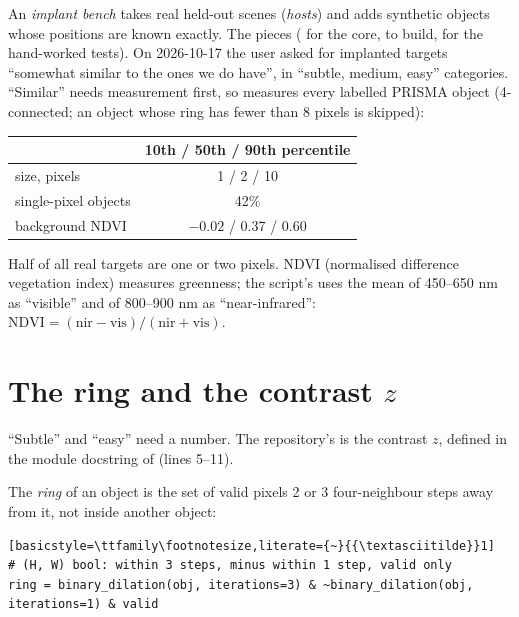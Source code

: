 An \emph{implant bench} takes real held-out scenes (\emph{hosts}) and adds synthetic objects
whose positions are known exactly. The pieces ( for the core,
 to build,  for the hand-worked
tests). On 2026-10-17 the user asked for implanted targets ``somewhat similar to the ones we do have'', in ``subtle,
medium, easy'' categories. ``Similar'' needs measurement first, so  measures every
labelled PRISMA object (4-connected; an object whose ring has fewer than 8 pixels is skipped)\hfil{}\hfilneg{}:

\begin{center}
\begin{tabular}{lc}
\toprule
 & 10th / 50th / 90th percentile \\
\midrule
size, pixels & 1 / 2 / 10 \\
single-pixel objects & 42\% \\
background NDVI & $-0.02$ / 0.37 / 0.60 \\
\bottomrule
\end{tabular}
\end{center}

Half of all real targets are one or two pixels. NDVI (normalised difference vegetation index) measures greenness;
the script's  uses the mean of 450--650 nm as ``visible'' and of 800--900 nm as ``near-infrared'':
$\mathrm{NDVI} = (\mathrm{nir} - \mathrm{vis})/(\mathrm{nir} + \mathrm{vis})$.

\section{The ring and the contrast $z$}\label{sec:benchmarks:z}

``Subtle'' and ``easy'' need a number. The repository's is the contrast $z$, defined in the module docstring of
 (lines 5--11).

\begin{definition}[Ring]
The \emph{ring} of an object is the set of valid pixels 2 or 3 four-neighbour steps away from it, not
inside another object:
\begin{lstlisting}[basicstyle=\ttfamily\footnotesize,literate={~}{{\textasciitilde}}1]
# (H, W) bool: within 3 steps, minus within 1 step, valid only
ring = binary_dilation(obj, iterations=3) & ~binary_dilation(obj, iterations=1) & valid
\end{lstlisting}
\end{definition}


